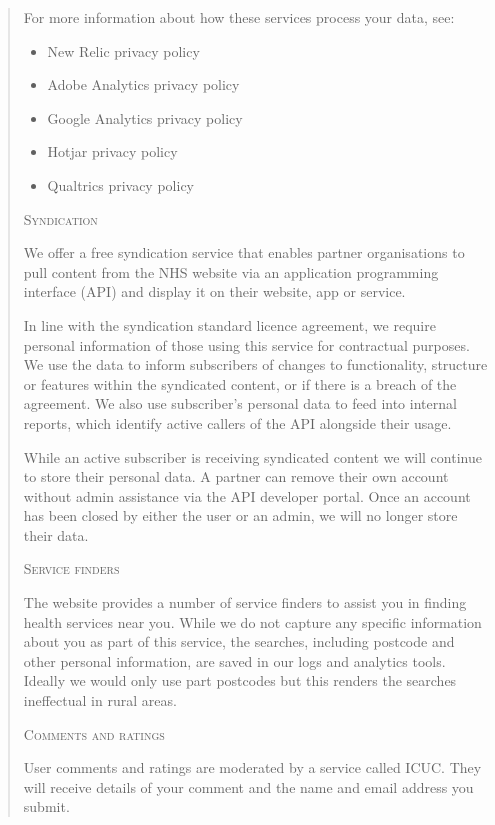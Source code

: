 \documentclass[twocolumn, letterpaper,13pt]{scrartcl}
\begin{document}
\begin{quote}
        For more information about how these services process your data, see:
        
        \begin{itemize}
            \item New Relic privacy policy
            \item Adobe Analytics privacy policy
            \item Google Analytics privacy policy
            \item Hotjar privacy policy
            \item Qualtrics privacy policy
        \end{itemize}
        
        \textsc{Syndication}
        
        We offer a free syndication service that enables partner organisations to pull content from the NHS website via an application programming interface (API) and display it on their website, app or service.
        
        In line with the syndication standard licence agreement, we require personal information of those using this service for contractual purposes. We use the data to inform subscribers of changes to functionality, structure or features within the syndicated content, or if there is a breach of the agreement. We also use subscriber's personal data to feed into internal reports, which identify active callers of the API alongside their usage.
        
        While an active subscriber is receiving syndicated content we will continue to store their personal data. A partner can remove their own account without admin assistance via the API developer portal. Once an account has been closed by either the user or an admin, we will no longer store their data.
        
        \textsc{Service finders}
        
        The website provides a number of service finders to assist you in finding health services near you. While we do not capture any specific information about you as part of this service, the searches, including postcode and other personal information, are saved in our logs and analytics tools. Ideally we would only use part postcodes but this renders the searches ineffectual in rural areas.
        
        \textsc{Comments and ratings}
        
        User comments and ratings are moderated by a service called ICUC. They will receive details of your comment and the name and email address you submit.
        

\end{quote}
\end{document}

